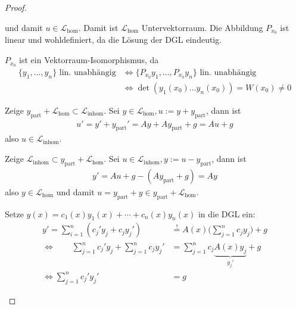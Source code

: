 \begin{theorem}[Satz]
\begin{proof}
\begin{enum-arab}
\begin{enum-alph}
        und damit $u \in \mathcal L_{\text{hom}}$.
        Damit ist $\mathcal L_{\text{hom}}$ Untervektorraum.
        Die Abbildung $P_{x_0}$ ist linear und wohldefiniert, da die Lösung der DGL eindeutig.
      \item
        $P_{x_0}$ ist ein Vektorraum-Isomorphismus, da
        \begin{align*}
          \{y_1, \dotsc, y_n\} \text{ lin. unabhängig}
          & \iff \{P_{x_0} y_1, \dotsc, P_{x_0} y_n \} \text{ lin. unabhängig} \\
          & \iff \det(y_1(x_0) \dotso y_n(x_0)) = W(x_0) \neq 0
        \end{align*}
      \end{enum-alph}
    \item
      \begin{enum-alph}

      \item
        Zeige $y_{\text{part}} + \mathcal L_{\text{hom}} \subset \mathcal L_{\text{inhom}}$.
        Sei $y \in \mathcal L_{\text{hom}}, u := y + y_{\text{part}}$, dann ist
        \begin{align*}
          u' = y' + y_{\text{part}}' = Ay + Ay_{\text{part}} + g = Au + g
        \end{align*}
        also $u \in \mathcal L_{\text{inhom}}$.

        Zeige $\mathcal L_{\text{inhom}} \subset y_{\text{part}} + \mathcal L_{\text{hom}}$.
        Sei $u \in \mathcal L_{\text{inhom}}, y := u - y_{\text{part}}$, dann ist
        \begin{align*}
          y' = Au + g - (A y_{\text{part}} + g) = Ay
        \end{align*}
        also $y \in \mathcal L_{\text{hom}}$ und damit $u = y_{\text{part}} + y \in y_{\text{part}} + \mathcal L_{\text{hom}}$.
      \item
        Setze $y(x) = c_1(x) y_1(x) + \dotsb + c_n(x) y_n(x)$ in die DGL ein:
        \begin{align*}
          y' = \sum_{i=1}^n (c_j' y_j + c_j y_j') &\stackrel != A(x) \bigg( \sum_{j=1}^n c_j y_j \bigg) + g \\
          \iff \qquad \sum_{j=1}^n c_j'y_j + \sum_{j=1}^n c_j y_j' &= \sum_{j=1}^n c_j \underbrace{A(x) y_j}_{y_j'} + g \\
          \iff \sum_{j=1}^n c_j' y_j' &= g
        \end{align*}
      \end{enum-alph}
    \end{enum-arab}
  \end{proof}
\end{theorem}

